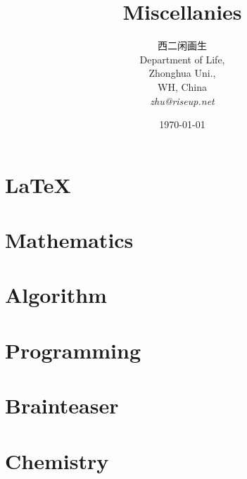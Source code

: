 \documentclass[a4paper,11pt]{book}
\begin{document}
\frontmatter{}

\title{Miscellanies}
\author{西二闲画生\\
  Department of Life,\\
  Zhonghua Uni.,\\
  WH, China\\
  \emph{zhu@riseup.net}}
\date{\today}
\maketitle



\setcounter{tocdepth}{3} %
\tableofcontents{}

\mainmatter{}

\part{\LaTeX{}}




\part{Mathematics}



\part{Algorithm}



\part{Programming}



\part{Brainteaser}



\part{Chemistry}
\label{part:chemistry}



\printbibliography[heading=bibintoc,title={Reference}]{}




\backmatter{}

\end{document}
